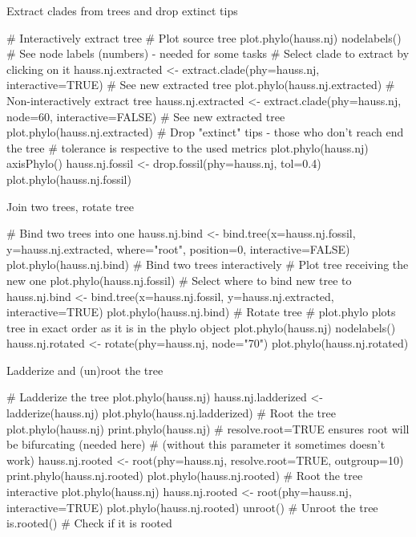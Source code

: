 \documentclass[compress, ucs, xelatex, 11pt, xcolor=svgnames,
  hyperref={
    bookmarks=true,
    unicode=true,
    colorlinks=true,
    pdftitle={Molecular data in R},
    plainpages=false,
    pdfauthor={Vojtech Zeisek},
    pdfsubject={Course about phylogeny and evolution in R},
    pdfcreator={XeLaTeX},
    pdfkeywords={R, evolution, phylogeny, molecular data},
    linkcolor=Tomato,
    anchorcolor=SaddleBrown,
    citecolor=Goldenrod,
    filecolor=DarkMagenta,
    menucolor=Sienna,
    urlcolor=DarkTurquoise,
    pdftex},
  url={hyphens, lowtilde} %
  ]{beamer}
\begin{document}
\begin{frame}[fragile]{Extract clades from trees and drop extinct tips}
  \begin{spluscode}
    # Interactively extract tree
    # Plot source tree
    plot.phylo(hauss.nj)
    nodelabels() # See node labels (numbers) - needed for some tasks
    # Select clade to extract by clicking on it
    hauss.nj.extracted <- extract.clade(phy=hauss.nj, interactive=TRUE)
    # See new extracted tree
    plot.phylo(hauss.nj.extracted)
    # Non-interactively extract tree
    hauss.nj.extracted <- extract.clade(phy=hauss.nj, node=60,
      interactive=FALSE)
    # See new extracted tree
    plot.phylo(hauss.nj.extracted)
    # Drop "extinct" tips - those who don't reach end the tree
    # tolerance is respective to the used metrics
    plot.phylo(hauss.nj)
    axisPhylo()
    hauss.nj.fossil <- drop.fossil(phy=hauss.nj, tol=0.4)
    plot.phylo(hauss.nj.fossil)
  \end{spluscode}
\end{frame}

\begin{frame}[fragile]{Join two trees, rotate tree}
  \begin{spluscode}
    # Bind two trees into one
    hauss.nj.bind <- bind.tree(x=hauss.nj.fossil, y=hauss.nj.extracted,
      where="root", position=0, interactive=FALSE)
    plot.phylo(hauss.nj.bind)
    # Bind two trees interactively
    # Plot tree receiving the new one
    plot.phylo(hauss.nj.fossil)
    # Select where to bind new tree to
    hauss.nj.bind <- bind.tree(x=hauss.nj.fossil, y=hauss.nj.extracted,
      interactive=TRUE)
    plot.phylo(hauss.nj.bind)
    # Rotate tree
    # plot.phylo plots tree in exact order as it is in the phylo object
    plot.phylo(hauss.nj)
    nodelabels()
    hauss.nj.rotated <- rotate(phy=hauss.nj, node="70")
    plot.phylo(hauss.nj.rotated)
  \end{spluscode}
\end{frame}

\begin{frame}[fragile]{Ladderize and (un)root the tree}
  \begin{spluscode}
    # Ladderize the tree
    plot.phylo(hauss.nj)
    hauss.nj.ladderized <- ladderize(hauss.nj)
    plot.phylo(hauss.nj.ladderized)
    # Root the tree
    plot.phylo(hauss.nj)
    print.phylo(hauss.nj)
    # resolve.root=TRUE ensures root will be bifurcating (needed here)
    # (without this parameter it sometimes doesn't work)
    hauss.nj.rooted <- root(phy=hauss.nj, resolve.root=TRUE, outgroup=10)
    print.phylo(hauss.nj.rooted)
    plot.phylo(hauss.nj.rooted)
    # Root the tree interactive
    plot.phylo(hauss.nj)
    hauss.nj.rooted <- root(phy=hauss.nj, interactive=TRUE)
    plot.phylo(hauss.nj.rooted)
    unroot() # Unroot the tree
    is.rooted() # Check if it is rooted
  \end{spluscode}
\end{frame}
\end{document}
